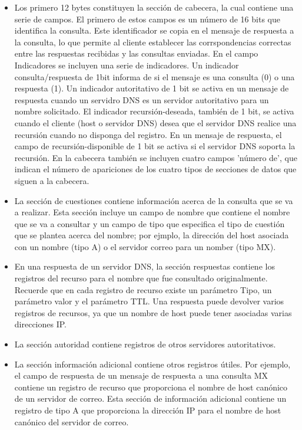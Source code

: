 \documentclass[a4paper,11pt]{article}
\begin{document}
\begin{itemize}
\item Los primero 12 bytes constituyen la sección de cabecera, la cual contiene una serie de campos. El primero de estos campos es un número de 16 bits que identifica la consulta. Este identificador se copia en el mensaje de respuesta a la consulta, lo que permite al cliente establecer las corrspondencias correctas entre las respuestas recibidas y las consultas enviadas. En el campo Indicadores se incluyen una serie de indicadores. Un indicador consulta/respuesta de 1bit informa de si el mensaje es una consulta (0) o una respuesta (1). Un indicador autoritativo de 1 bit se activa en un mensaje de respuesta cuando un servidro DNS es un servidor autoritativo para un nombre solicitado. El indicador recursión-deseada, también de 1 bit, se activa cuando el cliente (host o servidor DNS) desea que el servidor DNS realice una recursión cuando no disponga del registro. En un mensaje de respuesta, el campo de recursión-disponible de 1 bit se activa si el servidor DNS soporta la recursión. En la cabecera también se incluyen cuatro campos 'número de', que indican el número de apariciones de los cuatro tipos de secciones de datos que siguen a la cabecera.

\item La sección de cuestiones contiene información acerca de la consulta que se va a realizar. Esta sección incluye un campo de nombre que contiene el nombre que se va a consultar y un campo de tipo que especifica el tipo de cuestión que se plantea acerca del nombre; por ejmplo, la dirección del host asociada con un nombre (tipo A) o el servidor correo para un nomber (tipo MX).

\item En una respuesta de un servidor DNS, la sección respuestas contiene los registros del recurso para el nombre que fue consultado originalmente. Recuerde que en cada registro de recurso existe un parámetro Tipo, un parámetro valor y el parámetro TTL. Una respuesta puede devolver varios registros de recursos, ya que un nombre de host puede tener asociadas varias direcciones IP.

\item La sección autoridad contiene registros de otros servidores autoritativos.

\item La sección información adicional contiene otros registros útiles. Por ejemplo, el campo de respuesta de un mensaje de respuesta a una consulta MX contiene un registro de recurso que proporciona el nombre de host canónico de un servidor de correo. Esta sección de información adicional contiene un registro de tipo A que proporciona la dirección IP para el nombre de host canónico del servidor de correo.
\end{itemize}
\end{document}
